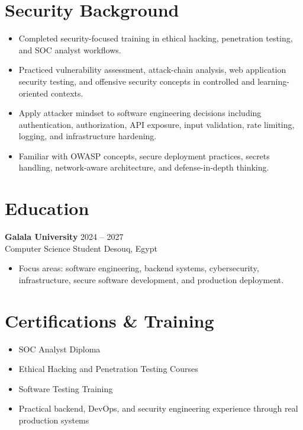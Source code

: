 \documentclass[10pt,a4paper]{article}
\newcommand{\entry}[4]{
  \textbf{\color{heading} #1} \hfill {\small \color{muted} #2}\\
  {\color{text} #3} \hfill {\small \color{muted} #4}
  \vspace{2pt}
}
\begin{document}
\section*{Security Background}

\begin{itemize}
  \item Completed security-focused training in ethical hacking, penetration testing, and SOC analyst workflows.
  \item Practiced vulnerability assessment, attack-chain analysis, web application security testing, and offensive security concepts in controlled and learning-oriented contexts.
  \item Apply attacker mindset to software engineering decisions including authentication, authorization, API exposure, input validation, rate limiting, logging, and infrastructure hardening.
  \item Familiar with OWASP concepts, secure deployment practices, secrets handling, network-aware architecture, and defense-in-depth thinking.
\end{itemize}

\section*{Education}

\entry
  {Galala University}
  {2024 -- 2027}
  {Computer Science Student}
  {Desouq, Egypt}

\begin{itemize}
  \item Focus areas: software engineering, backend systems, cybersecurity, infrastructure, secure software development, and production deployment.
\end{itemize}

\section*{Certifications \& Training}

\begin{itemize}
  \item SOC Analyst Diploma
  \item Ethical Hacking and Penetration Testing Courses
  \item Software Testing Training
  \item Practical backend, DevOps, and security engineering experience through real production systems
\end{itemize}
\end{document}
